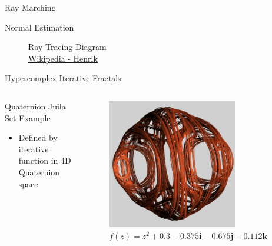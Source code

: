\documentclass[aspectratio=169,t]{beamer}
\begin{document}
\begin{frame}[label={sec:orgbcbe107}]{Ray Marching}
\end{frame}



\begin{frame}[label={sec:org025e5f5}]{Normal Estimation}
\begin{figure}[htbp]


\caption{Ray Tracing Diagram \\ \ccbysa \href{https://commons.wikimedia.org/wiki/File:Ray\_trace\_diagram.svg}{Wikipedia - Henrik}}
\end{figure}
\end{frame}

\begin{frame}[label={sec:org584d7c8}]{Hypercomplex Iterative Fractals}
\begin{columns}
\begin{column}{0.55\columnwidth}
\begin{block}{Quaternion Juila Set Example}
\begin{itemize}
\item Defined by iterative function in 4D Quaternion space
\end{itemize}
\end{block}
\end{column}

\begin{column}{0.45\columnwidth}
\begin{figure}[htbp]
\centering
\includegraphics[width=0.75\textwidth]{./Figs/Fig_1v2.png}
\caption{\(f(z) = z^2 + 0.3 - 0.375\symbf{i} - 0.675\symbf{j} - 0.112\symbf{k}\)}
\end{figure}
\end{column}
\end{columns}
\end{frame}
\end{document}
